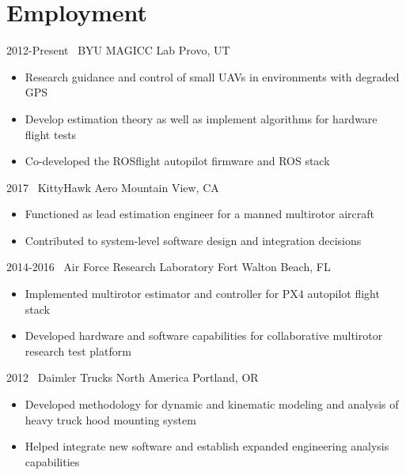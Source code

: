 

\section{Employment}

\begin{entrylist}
\entry
{2012-Present}
{\magicc~BYU MAGICC Lab}
{Provo, UT}
{
\begin{itemize}
	\item Research guidance and control of small UAVs in environments with degraded GPS
	\item Develop estimation theory as well as implement algorithms for hardware flight tests
	\item Co-developed the ROSflight autopilot firmware and ROS stack
\end{itemize}
}
\entry
{2017}
{\kittyhawk~KittyHawk Aero}
{Mountain View, CA}
{
\begin{itemize}
	\item Functioned as lead estimation engineer for a manned multirotor aircraft
	\item Contributed to system-level software design and integration decisions
\end{itemize}
}
\entry
{2014-2016}
{\afrl~Air Force Research Laboratory}
{Fort Walton Beach, FL}
{
\begin{itemize}
	\item Implemented multirotor estimator and controller for PX4 autopilot flight stack
	\item Developed hardware and software capabilities for collaborative multirotor research test platform
\end{itemize}
}
\entry
{2012}
{\daimler~Daimler Trucks North America}
{Portland, OR}
{
\begin{itemize}
	\item Developed methodology for dynamic and kinematic modeling and analysis of heavy truck hood mounting system
	\item Helped integrate new software and establish expanded engineering analysis capabilities
\end{itemize}}
\entry

\end{entrylist}
